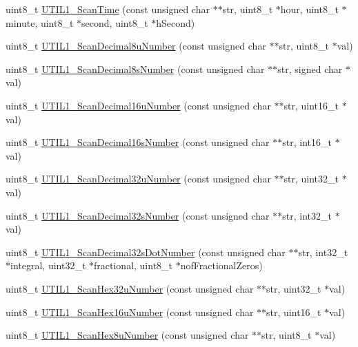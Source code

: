 \begin{DoxyCompactItemize}
\item 
uint8\+\_\+t \hyperlink{group___u_t_i_l1__module_ga9ec1d18020c522a1f0060a04e8731768}{U\+T\+I\+L1\+\_\+\+Scan\+Time} (const unsigned char $\ast$$\ast$str, uint8\+\_\+t $\ast$hour, uint8\+\_\+t $\ast$minute, uint8\+\_\+t $\ast$second, uint8\+\_\+t $\ast$h\+Second)
\item 
uint8\+\_\+t \hyperlink{group___u_t_i_l1__module_ga46237d655750f5680f3b435c24203995}{U\+T\+I\+L1\+\_\+\+Scan\+Decimal8u\+Number} (const unsigned char $\ast$$\ast$str, uint8\+\_\+t $\ast$val)
\item 
uint8\+\_\+t \hyperlink{group___u_t_i_l1__module_gaef1d29f6999ab1dee8f03b112227c7b3}{U\+T\+I\+L1\+\_\+\+Scan\+Decimal8s\+Number} (const unsigned char $\ast$$\ast$str, signed char $\ast$val)
\item 
uint8\+\_\+t \hyperlink{group___u_t_i_l1__module_ga72ae8610f443363e90b3af700e8b3d49}{U\+T\+I\+L1\+\_\+\+Scan\+Decimal16u\+Number} (const unsigned char $\ast$$\ast$str, uint16\+\_\+t $\ast$val)
\item 
uint8\+\_\+t \hyperlink{group___u_t_i_l1__module_gaca3d88e3c987140046c78fa1bf5b865f}{U\+T\+I\+L1\+\_\+\+Scan\+Decimal16s\+Number} (const unsigned char $\ast$$\ast$str, int16\+\_\+t $\ast$val)
\item 
uint8\+\_\+t \hyperlink{group___u_t_i_l1__module_ga406f2de04b8581e777e95cb94b425108}{U\+T\+I\+L1\+\_\+\+Scan\+Decimal32u\+Number} (const unsigned char $\ast$$\ast$str, uint32\+\_\+t $\ast$val)
\item 
uint8\+\_\+t \hyperlink{group___u_t_i_l1__module_gae5148500cd80c7aa4a92414865daedb0}{U\+T\+I\+L1\+\_\+\+Scan\+Decimal32s\+Number} (const unsigned char $\ast$$\ast$str, int32\+\_\+t $\ast$val)
\item 
uint8\+\_\+t \hyperlink{group___u_t_i_l1__module_ga0061e88b3fe23c58d0cb642e361c150a}{U\+T\+I\+L1\+\_\+\+Scan\+Decimal32s\+Dot\+Number} (const unsigned char $\ast$$\ast$str, int32\+\_\+t $\ast$integral, uint32\+\_\+t $\ast$fractional, uint8\+\_\+t $\ast$nof\+Fractional\+Zeros)
\item 
uint8\+\_\+t \hyperlink{group___u_t_i_l1__module_ga5f1c591000247929c3cd22bcbdae8460}{U\+T\+I\+L1\+\_\+\+Scan\+Hex32u\+Number} (const unsigned char $\ast$$\ast$str, uint32\+\_\+t $\ast$val)
\item 
uint8\+\_\+t \hyperlink{group___u_t_i_l1__module_gafd61ec9c084c8a1d48095f6e065f7cef}{U\+T\+I\+L1\+\_\+\+Scan\+Hex16u\+Number} (const unsigned char $\ast$$\ast$str, uint16\+\_\+t $\ast$val)
\item 
uint8\+\_\+t \hyperlink{group___u_t_i_l1__module_ga1044521103b92623f2fea4d7287f5c38}{U\+T\+I\+L1\+\_\+\+Scan\+Hex8u\+Number} (const unsigned char $\ast$$\ast$str, uint8\+\_\+t $\ast$val)
$$
\end{DoxyCompactItemize}
